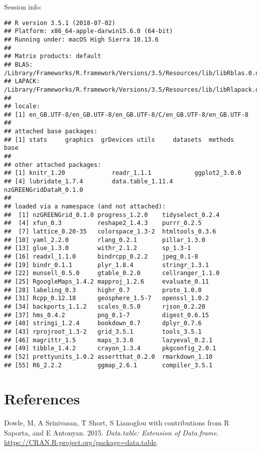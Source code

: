 \documentclass[]{article}
\theoremstyle{definition}
\theoremstyle{definition}
\theoremstyle{definition}
\theoremstyle{remark}
\begin{document}
Session info:

\begin{verbatim}
## R version 3.5.1 (2018-07-02)
## Platform: x86_64-apple-darwin15.6.0 (64-bit)
## Running under: macOS High Sierra 10.13.6
## 
## Matrix products: default
## BLAS: /Library/Frameworks/R.framework/Versions/3.5/Resources/lib/libRblas.0.dylib
## LAPACK: /Library/Frameworks/R.framework/Versions/3.5/Resources/lib/libRlapack.dylib
## 
## locale:
## [1] en_GB.UTF-8/en_GB.UTF-8/en_GB.UTF-8/C/en_GB.UTF-8/en_GB.UTF-8
## 
## attached base packages:
## [1] stats     graphics  grDevices utils     datasets  methods   base     
## 
## other attached packages:
## [1] knitr_1.20             readr_1.1.1            ggplot2_3.0.0         
## [4] lubridate_1.7.4        data.table_1.11.4      nzGREENGridDataR_0.1.0
## 
## loaded via a namespace (and not attached):
##  [1] nzGREENGrid_0.1.0 progress_1.2.0    tidyselect_0.2.4 
##  [4] xfun_0.3          reshape2_1.4.3    purrr_0.2.5      
##  [7] lattice_0.20-35   colorspace_1.3-2  htmltools_0.3.6  
## [10] yaml_2.2.0        rlang_0.2.1       pillar_1.3.0     
## [13] glue_1.3.0        withr_2.1.2       sp_1.3-1         
## [16] readxl_1.1.0      bindrcpp_0.2.2    jpeg_0.1-8       
## [19] bindr_0.1.1       plyr_1.8.4        stringr_1.3.1    
## [22] munsell_0.5.0     gtable_0.2.0      cellranger_1.1.0 
## [25] RgoogleMaps_1.4.2 mapproj_1.2.6     evaluate_0.11    
## [28] labeling_0.3      highr_0.7         proto_1.0.0      
## [31] Rcpp_0.12.18      geosphere_1.5-7   openssl_1.0.2    
## [34] backports_1.1.2   scales_0.5.0      rjson_0.2.20     
## [37] hms_0.4.2         png_0.1-7         digest_0.6.15    
## [40] stringi_1.2.4     bookdown_0.7      dplyr_0.7.6      
## [43] rprojroot_1.3-2   grid_3.5.1        tools_3.5.1      
## [46] magrittr_1.5      maps_3.3.0        lazyeval_0.2.1   
## [49] tibble_1.4.2      crayon_1.3.4      pkgconfig_2.0.1  
## [52] prettyunits_1.0.2 assertthat_0.2.0  rmarkdown_1.10   
## [55] R6_2.2.2          ggmap_2.6.1       compiler_3.5.1
\end{verbatim}

\section*{References}\label{references}

\hypertarget{refs}{}
\hypertarget{ref-data.table}{}
Dowle, M, A Srinivasan, T Short, S Lianoglou with contributions from R
Saporta, and E Antonyan. 2015. \emph{Data.table: Extension of
Data.frame}. \url{https://CRAN.R-project.org/package=data.table}.
\end{document}
